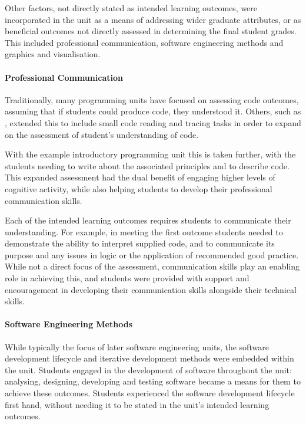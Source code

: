 Other factors, not directly stated as intended learning outcomes, were incorporated in the unit as a means of addressing wider graduate attributes, or as beneficial outcomes not directly assessed in determining the final student grades. This included professional communication, software engineering methods and graphics and visualisation.

\paragraph{Professional Communication} %
\label{par:professional_communication}

Traditionally, many programming units have focused on assessing code outcomes, assuming that if students could produce code, they understood it. Others, such as \citet{Lister:2004}, extended this to include small code reading and tracing tasks in order to expand on the assessment of student's understanding of code. 

With the example introductory programming unit this is taken further, with the students needing to write about the associated principles and to describe code. This expanded assessment had the dual benefit of engaging higher levels of cognitive activity, while also helping students to develop their professional communication skills.

Each of the intended learning outcomes requires students to communicate their understanding. For example, in meeting the first outcome students needed to demonstrate the ability to interpret supplied code, and to communicate its purpose and any issues in logic or the application of recommended good practice. While not a direct focus of the assessment, communication skills play an enabling role in achieving this, and students were provided with support and encouragement in developing their communication skills alongside their technical skills.

 
\paragraph{Software Engineering Methods} %
\label{par:software_engineering_methods}

While typically the focus of later software engineering units, the software development lifecycle and iterative development methods were embedded within the unit. Students engaged in the development of software throughout the unit: analysing, designing, developing and testing software became a means for them to achieve these outcomes. Students experienced the software development lifecycle first hand, without needing it to be stated in the unit's intended learning outcomes.

